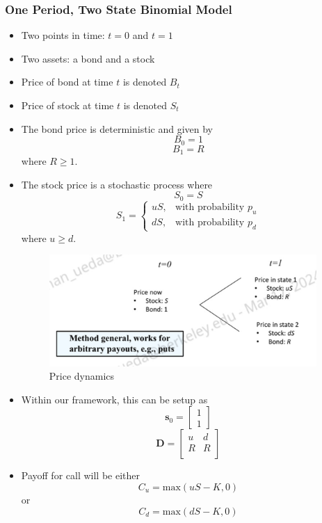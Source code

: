 \documentclass[11pt]{article}
\begin{document}
\subsubsection{One Period, Two State Binomial Model}
\begin{itemize}
    \item Two points in time: $t=0$ and $t=1$
    \item Two assets: a bond and a stock 
    \item Price of bond at time $t$ is denoted $B_t$
    \item Price of stock at time $t$ is denoted $S_t$
    \item The bond price is deterministic and given by 
    \[B_0 = 1\]
    \[B_1 = R\]
    where $R \ge 1$.
    \item The stock price is a stochastic process where 
    \[S_0 = S\]
    \[
    S_1 = \begin{cases}
        uS, & \text{with probability } p_u \\
        dS, & \text{with probability } p_d
    \end{cases}
    \] where $u \ge d$.

    \begin{figure}[H] 
        \centering 
        \includegraphics[width=4in]{imgs/one_period_two_state_bin_tree_model.png}
        \caption{Price dynamics}
    \end{figure}
    \item Within our framework, this can be setup as 
    \[
    \boldsymbol{s}_0 = \begin{bmatrix}
        1 \\ 
        1
    \end{bmatrix}
    \]
    \[ 
    \boldsymbol{D} = \begin{bmatrix}
        u & d \\
        R & R \\
    \end{bmatrix}
    \]

    \item Payoff for call will be either 
    \[C_u = \text{max}(uS - K, 0)\]
    or 
    \[C_d = \text{max}(dS - K, 0)\]
\end{itemize}
\end{document}
